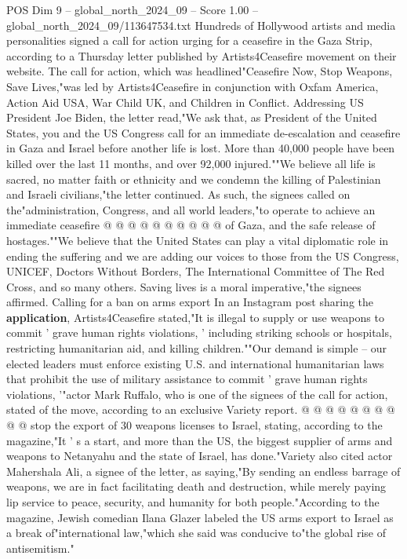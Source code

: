 \begin{textsample}{POS Dim 9 – global\_north\_2024\_09 – Score 1.00 – global\_north\_2024\_09/113647534.txt}  \label{ex:f9_pos_433}
Hundreds of Hollywood artists and media personalities signed a call for action urging for a ceasefire in the Gaza Strip, according to a Thursday letter published by Artists4Ceasefire movement on their website.
The call for action, which was headlined"Ceasefire Now, Stop Weapons, Save Lives,"was led by Artists4Ceasefire in conjunction with Oxfam America, Action Aid USA, War Child UK, and Children in Conflict.
Addressing US President Joe Biden, the letter read,"We ask that, as President of the United States, you and the US Congress call for an immediate de-escalation and ceasefire in Gaza and Israel before another life is lost.
More than 40,000 people have been killed over the last 11 months, and over 92,000 injured.""We believe all life is sacred, no matter faith or ethnicity and we condemn the killing of Palestinian and Israeli civilians,"the letter continued.
As such, the signees called on the"administration, Congress, and all world leaders,"to operate to achieve an immediate ceasefire @ @ @ @ @ @ @ @ @ @ of Gaza, and the safe release of hostages.""We believe that the United States can play a vital diplomatic role in ending the suffering and we are adding our voices to those from the US Congress, UNICEF, Doctors Without Borders, The International Committee of The Red Cross, and so many others.
Saving lives is a moral imperative,"the signees affirmed.
Calling for a ban on arms export In an Instagram post sharing the \textbf{application}, Artists4Ceasefire stated,"It is illegal to supply or use weapons to commit ' grave human rights violations, ' including striking schools or hospitals, restricting humanitarian aid, and killing children.""Our demand is simple -- our elected leaders must enforce existing U.S. and international humanitarian laws that prohibit the use of military assistance to commit ' grave human rights violations, '"actor Mark Ruffalo, who is one of the signees of the call for action, stated of the move, according to an exclusive Variety report. @ @ @ @ @ @ @ @ @ @ stop the export of 30 weapons licenses to Israel, stating, according to the magazine,"It ' s a start, and more than the US, the biggest supplier of arms and weapons to Netanyahu and the state of Israel, has done."Variety also cited actor Mahershala Ali, a signee of the letter, as saying,"By sending an endless barrage of weapons, we are in fact facilitating death and destruction, while merely paying lip service to peace, security, and humanity for both people."According to the magazine, Jewish comedian Ilana Glazer labeled the US arms export to Israel as a break of"international law,"which she said was conducive to"the global rise of antisemitism."

\end{textsample}
